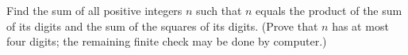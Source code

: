 Find the sum of all positive integers $n$ such that $n$ equals the product of the sum of its digits and the sum of the squares of its digits. (Prove that $n$ has at most four digits; the remaining finite check may be done by computer.)

